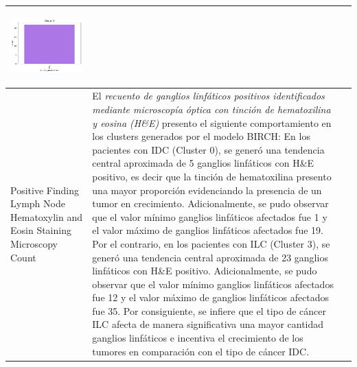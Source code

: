 \begin{table}[htb!]
\begin{threeparttable}
\begin{tabular}{p{2.5cm} p{7cm} p{6.5cm}}
			\begin{center}\includegraphics[width=1\linewidth]{NOTEBOOK/IMAGENES_BIRCH_CLUSTERING/6_Cluster_3_lymph_presentation}\end{center}
			
			\\ \hline
			Positive Finding Lymph Node Hematoxylin and Eosin Staining Microscopy Count
			& El \textit{recuento de ganglios linfáticos positivos identificados mediante microscopía óptica con tinción de hematoxilina y eosina (H\&E)} presento el siguiente comportamiento en los clusters generados por el modelo BIRCH: En los pacientes con IDC (Cluster 0), se generó una tendencia central aproximada de 5 ganglios linfáticos con H\&E positivo, es decir que la tinción de hematoxilina presento una mayor proporción evidenciando la presencia de un tumor en crecimiento. Adicionalmente, se pudo observar que el valor mínimo ganglios linfáticos afectados fue 1 y el valor máximo de ganglios linfáticos afectados fue 19. Por el contrario, en los pacientes con ILC (Cluster 3), se generó una tendencia central aproximada de 23 ganglios linfáticos con H\&E positivo. Adicionalmente, se pudo observar que el valor mínimo ganglios linfáticos afectados fue 12 y el valor máximo de ganglios linfáticos afectados fue 35. Por consiguiente, se infiere que el tipo de cáncer ILC afecta de manera significativa una mayor cantidad ganglios linfáticos e incentiva el crecimiento de los tumores en comparación con el tipo de cáncer IDC.
			

\end{tabular}
\end{threeparttable}
\end{table}
